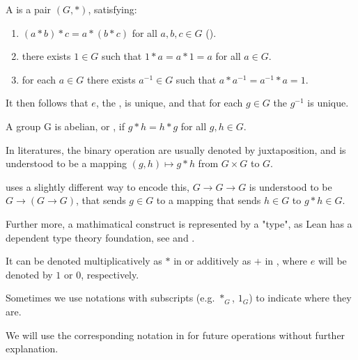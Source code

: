 \begin{definition}[Group]
    \label{Group}
    \leanok

    A  is a pair $(G, *)$, satisfying:

    \begin{enumerate}
    \item $(a * b) * c = a * (b * c)$ for all $a, b, c \in G$ ().
    \item there exists $1 \in G$ such that $1 * a = a * 1 = a$ for all $a \in G$.
    \item for each $a \in G$ there exists $a^{-1} \in G$ such that $a * a^{-1} = a^{-1} * a = 1$.

    \end{enumerate}

\end{definition}

\begin{remark}
    \label{mk:Group}
    
    It then follows that $e$, the , is unique, and that for each $g \in G$ the  $g^{-1}$ is unique.

    A group G is abelian, or , if $g * h = h * g$ for all $g, h \in G$.

\end{remark}

\begin{remark}
    \label{mk:Notation}

    In literatures, the binary operation are usually denoted by juxtaposition, and is understood to be a mapping
    $(g, h) \mapsto g * h$ from $G \times G$ to $G$.
    
    \Mathlib uses a slightly different way to encode this, $G \to G \to G$ is understood to be $G \to (G \to G)$,
    that sends $g \in G$ to a mapping that sends $h \in G$ to $g * h \in G$.
    
    Further more, a mathimatical construct is represented by a "type", as Lean has a dependent type theory foundation,
    see \cite{carneiro2019type} and \cite[section 3.2]{ullrich2023extensible}.
    
    It can be denoted multiplicatively as $*$ in 
    or additively as $+$ in , where $e$ will be denoted by $1$ or $0$, respectively.

    Sometimes we use notations with subscripts (e.g. $*_G$, $1_G$) to indicate where they are.

    We will use the corresponding notation in \Mathlib for future operations without further explanation.

\end{remark}

